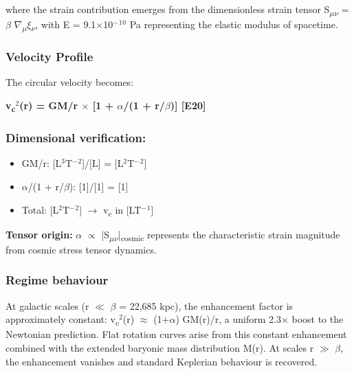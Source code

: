 \documentclass[11pt,a4paper]{article}
\begin{document}
where the strain contribution emerges from the dimensionless strain tensor S\textsubscript{$\mu$$\nu$} = $\beta$ $\nabla$\textsubscript{$\mu$}$\xi$\textsubscript{$\nu$}, with E = 9.1$\times$10$^{-}$$^{1}$$^{0}$ Pa representing the elastic modulus of spacetime.

\subsubsection{Velocity Profile}
The circular velocity becomes:

\textbf{v\textsubscript{c}$^{2}$(r) = GM/\allowbreak{}r $\times$ [1 + $\alpha$/(1 + r/\allowbreak{}$\beta$)] [E20]}

\begin{mdframed}[linecolor=accent,linewidth=0.5pt,backgroundcolor=callout-bg,leftline=true,rightline=true,topline=true,bottomline=true,innerleftmargin=8pt,innerrightmargin=8pt,innertopmargin=6pt,innerbottommargin=6pt]
\subsubsection{Dimensional verification:}
\begin{itemize}
  \item GM/\allowbreak{}r: [L$^{3}$T$^{-}$$^{2}$]/[L] = [L$^{2}$T$^{-}$$^{2}$] \checkmark{}
  \item $\alpha$/(1 + r/\allowbreak{}$\beta$): [1]/[1] = [1] \checkmark{}
  \item Total: [L$^{2}$T$^{-}$$^{2}$] $\rightarrow$ v\textsubscript{c} in [LT$^{-}$$^{1}$] \checkmark{}
\end{itemize}
\end{mdframed}

\textbf{Tensor origin:} $\alpha$ $\propto$ |S\textsubscript{$\mu$$\nu$}|\textsubscript{cosmic} represents the characteristic strain magnitude from cosmic stress tensor dynamics.

\subsubsection{Regime behaviour}
At galactic scales (r $\ll$ $\beta$ = 22,685 kpc), the enhancement factor is approximately constant: v\textsubscript{c}$^{2}$(r) $\approx$ (1+$\alpha$) GM(r)/r, a uniform 2.3$\times$ boost to the Newtonian prediction. Flat rotation curves arise from this constant enhancement combined with the extended baryonic mass distribution M(r). At scales r $\gg$ $\beta$, the enhancement vanishes and standard Keplerian behaviour is recovered.
\end{document}
